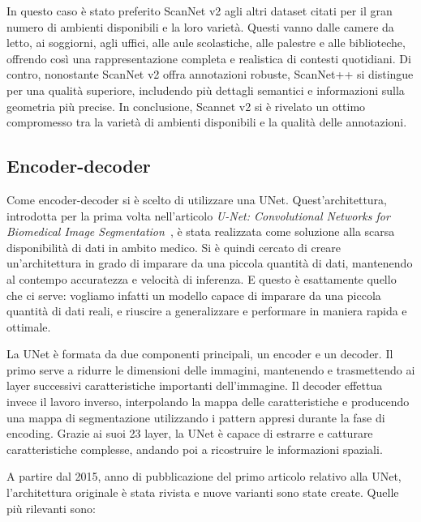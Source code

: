 \documentclass[12pt]{report}
\begin{document}
In questo caso è stato preferito ScanNet v2 agli altri dataset citati per il gran numero di ambienti disponibili e la loro varietà. Questi vanno dalle camere da letto, ai soggiorni, agli uffici, alle aule scolastiche, alle palestre e alle biblioteche, offrendo così una rappresentazione completa e realistica di contesti quotidiani. Di contro, nonostante ScanNet v2 offra annotazioni robuste, ScanNet++ si distingue per una qualità superiore, includendo più dettagli semantici e informazioni sulla geometria più precise. In conclusione, Scannet v2 si è rivelato un ottimo compromesso tra la varietà di ambienti disponibili e la qualità delle annotazioni.

\subsection{Encoder-decoder}
\label{chap:encoder_decoder}

Come encoder-decoder si è scelto di utilizzare una UNet. Quest'architettura, introdotta per la prima volta nell'articolo \textit{U-Net: Convolutional Networks for Biomedical Image Segmentation}~\cite{ronneberger2015u}, è stata realizzata come soluzione alla scarsa disponibilità di dati in ambito medico. Si è quindi cercato di creare un'architettura in grado di imparare da una piccola quantità di dati, mantenendo al contempo accuratezza e velocità di inferenza. E questo è esattamente quello che ci serve: vogliamo infatti un modello capace di imparare da una piccola quantità di dati reali, e riuscire a generalizzare e performare in maniera rapida e ottimale. 

La UNet è formata da due componenti principali, un encoder e un decoder. Il primo serve a ridurre le dimensioni delle immagini, mantenendo e trasmettendo ai layer successivi caratteristiche importanti dell'immagine. Il decoder effettua invece il lavoro inverso, interpolando la mappa delle caratteristiche e producendo una mappa di segmentazione utilizzando i pattern appresi durante la fase di encoding. Grazie ai suoi 23 layer, la UNet è capace di estrarre e catturare caratteristiche complesse, andando poi a ricostruire le informazioni spaziali.

A partire dal 2015, anno di pubblicazione del primo articolo relativo alla UNet, l'architettura originale è stata rivista e nuove varianti sono state create. Quelle più rilevanti sono:
\end{document}
